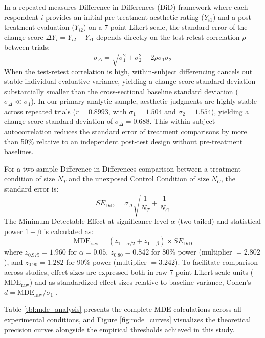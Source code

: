 \documentclass[12pt, letterpaper]{article}
\begin{document}
In a repeated-measures Difference-in-Differences (DiD) framework where each respondent $i$ provides an initial pre-treatment aesthetic rating ($Y_{i1}$) and a post-treatment evaluation ($Y_{i2}$) on a 7-point Likert scale, the standard error of the change score $\Delta Y_i = Y_{i2} - Y_{i1}$ depends directly on the test-retest correlation $\rho$ between trials:
\begin{equation}
\sigma_{\Delta} = \sqrt{\sigma_1^2 + \sigma_2^2 - 2 \rho \sigma_1 \sigma_2}
\end{equation}
When the test-retest correlation is high, within-subject differencing cancels out stable individual evaluative variance, yielding a change-score standard deviation substantially smaller than the cross-sectional baseline standard deviation ($\sigma_{\Delta} \ll \sigma_1$). In our primary analytic sample, aesthetic judgments are highly stable across repeated trials ($r = 0.8993$, with $\sigma_1 = 1.504$ and $\sigma_2 = 1.554$), yielding a change-score standard deviation of $\sigma_{\Delta} = 0.688$. This within-subject autocorrelation reduces the standard error of treatment comparisons by more than 50\% relative to an independent post-test design without pre-treatment baselines.

For a two-sample Difference-in-Differences comparison between a treatment condition of size $N_T$ and the unexposed Control Condition of size $N_C$, the standard error is:
\begin{equation}
SE_{\text{DiD}} = \sigma_{\Delta} \sqrt{\frac{1}{N_T} + \frac{1}{N_C}}
\end{equation}
The Minimum Detectable Effect at significance level $\alpha$ (two-tailed) and statistical power $1 - \beta$ is calculated as:
\begin{equation}
\text{MDE}_{\text{raw}} = (z_{1 - \alpha/2} + z_{1 - \beta}) \times SE_{\text{DiD}}
\end{equation}
where $z_{0.975} = 1.960$ for $\alpha = 0.05$, $z_{0.80} = 0.842$ for 80\% power (multiplier $= 2.802$), and $z_{0.90} = 1.282$ for 90\% power (multiplier $= 3.242$). To facilitate comparison across studies, effect sizes are expressed both in raw 7-point Likert scale units ($\text{MDE}_{\text{raw}}$) and as standardized effect sizes relative to baseline variance, Cohen's $d = \text{MDE}_{\text{raw}} / \sigma_1$ \citep{cohen1988statistical}.

Table \ref{tbl:mde_analysis} presents the complete MDE calculations across all experimental conditions, and Figure \ref{fig:mde_curves} visualizes the theoretical precision curves alongside the empirical thresholds achieved in this study.
\end{document}
